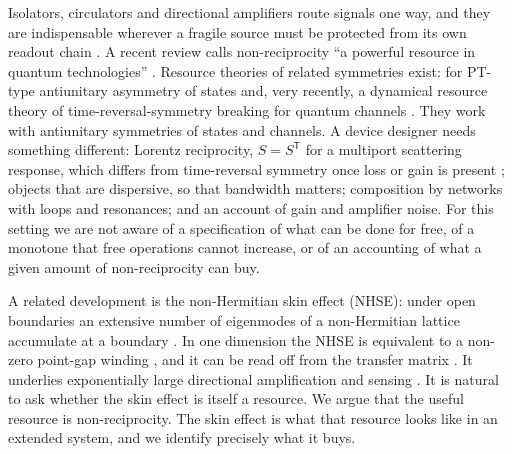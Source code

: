 \documentclass[aps,pra,twocolumn,superscriptaddress,floatfix,nofootinbib]{revtex4-2}
\theoremstyle{definition}
\newcommand{\T}{\mathsf T}
\begin{document}
Isolators, circulators and directional amplifiers route signals one way, and they are indispensable wherever a fragile source must be protected from its own readout chain \cite{Jal13,Cal18,Bar25}. A recent review calls non-reciprocity ``a powerful resource in quantum technologies'' \cite{Bar25}. Resource theories \cite{CG19} of related symmetries exist: for PT-type antiunitary asymmetry of states \cite{BFPW16} and, very recently, a dynamical resource theory of time-reversal-symmetry breaking for quantum channels \cite{MKM26}. They work with antiunitary symmetries of states and channels. A device designer needs something different: Lorentz reciprocity, $S=S^\T$ for a multiport scattering response, which differs from time-reversal symmetry once loss or gain is present \cite{Jal13,Cal18}; objects that are dispersive, so that bandwidth matters; composition by networks with loops and resonances; and an account of gain and amplifier noise. For this setting we are not aware of a specification of what can be done for free, of a monotone that free operations cannot increase, or of an accounting of what a given amount of non-reciprocity can buy.

A related development is the non-Hermitian skin effect (NHSE): under open boundaries an extensive number of eigenmodes of a non-Hermitian lattice accumulate at a boundary \cite{HN96,YW18,KEBB18,AGU20,BBK21}. In one dimension the NHSE is equivalent to a non-zero point-gap winding \cite{OKSS20,ZYF20}, and it can be read off from the transfer matrix \cite{KD19}. It underlies exponentially large directional amplification \cite{Por19,WBN20,WBN21,ZRR21,Xue21,BWN23} and sensing \cite{MC20}. It is natural to ask whether the skin effect is itself a resource. We argue that the useful resource is non-reciprocity. The skin effect is what that resource looks like in an extended system, and we identify precisely what it buys.
\end{document}
